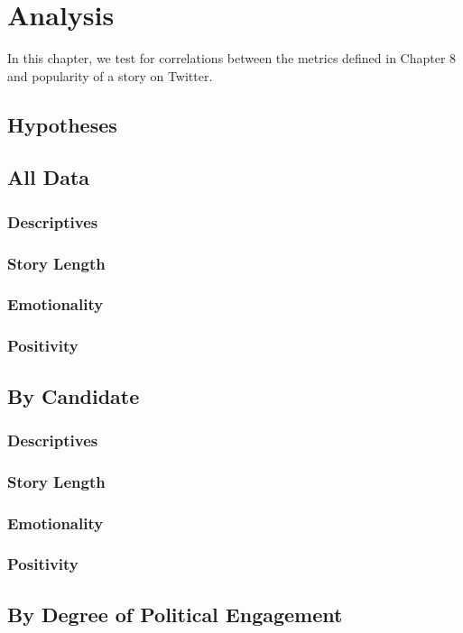 
\chapter{Analysis}
In this chapter, we test for correlations between the metrics defined in Chapter 8 and popularity of a story on Twitter.

\section{Hypotheses}

\section{All Data}
\subsection{Descriptives}
\subsection{Story Length}
\subsection{Emotionality}
\subsection{Positivity}

\section{By Candidate}
\subsection{Descriptives}
\subsection{Story Length}
\subsection{Emotionality}
\subsection{Positivity}


\section{By Degree of Political Engagement}
